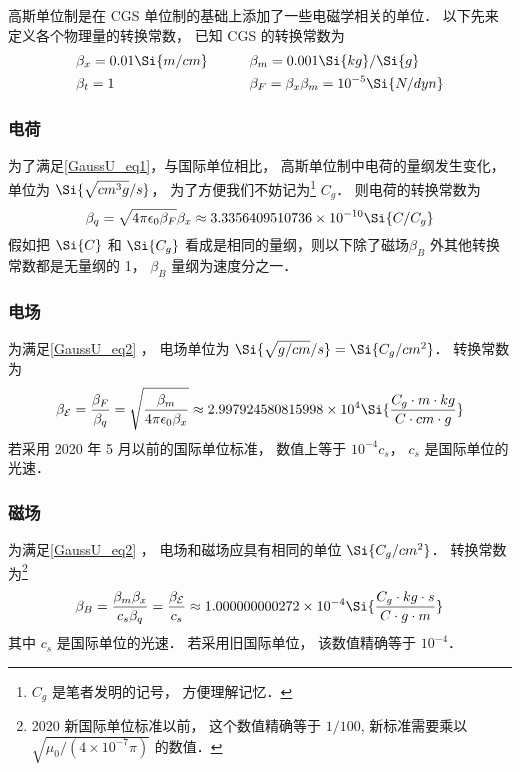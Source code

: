 

高斯单位制是在 CGS 单位制的基础上添加了一些电磁学相关的单位． 以下先来定义各个物理量的转换常数， 
已知 CGS 的转换常数为
\begin{equation}
\begin{aligned}
&\beta_x = 0.01\Si{m/cm} &\qquad &\beta_m = 0.001\Si{kg}/\Si{g}\\
&\beta_t = 1 &\qquad  &\beta_F = \beta_x \beta_m = 10^{-5}\Si{N/dyn}
\end{aligned}
\end{equation}

\subsubsection{电荷}
为了满足\autoref{GaussU_eq1}，与国际单位相比， 高斯单位制中电荷的量纲发生变化， 单位为 $\Si{\sqrt{cm^3 g}/s}$， 为了方便我们不妨记为\footnote{$C_g$ 是笔者发明的记号， 方便理解记忆．} $C_g$． 则电荷的转换常数为
\begin{equation}
\beta_q = \sqrt{4\pi\epsilon_0\beta_F} \beta_x \approx 3.3356409510736\times 10^{-10} \Si{C/C_g}
\end{equation}
假如把 $\Si{C}$ 和 $\Si{C_g}$ 看成是相同的量纲，则以下除了磁场$\beta_B$ 外其他转换常数都是无量纲的 1， $\beta_B$ 量纲为速度分之一．

\subsubsection{电场}
为满足\autoref{GaussU_eq2} ， 电场单位为 $\Si{\sqrt{g/cm}/s} = \Si{C_g/cm^2}$． 转换常数为
\begin{equation}
\beta_{\mathcal E} = \frac{\beta_F}{\beta_q} = \sqrt{\frac{\beta_m}{4\pi\epsilon_0 \beta_x}} \approx 2.997924580815998\times 10^4 \Si{\frac{C_g\cdot m\cdot kg}{C\cdot cm\cdot g}}
\end{equation}
若采用 2020 年 5 月以前的国际单位标准， 数值上等于 $10^{-4} c_{s}$， $c_{s}$ 是国际单位的光速．

\subsubsection{磁场}
为满足\autoref{GaussU_eq2} ， 电场和磁场应具有相同的单位 $\Si{C_g/cm^2}$． 转换常数为\footnote{2020 新国际单位标准以前， 这个数值精确等于 $1/100$, 新标准需要乘以 $\sqrt{\mu_0/(4\times 10^{-7}\pi)}$ 的数值．}
\begin{equation}
\beta_B = \frac{\beta_m\beta_x}{c_s\beta_q} = \frac{\beta_{\mathcal E}}{c_s} \approx 1.000000000272\times 10^{-4} \Si{\frac{C_g\cdot kg \cdot s}{C \cdot g \cdot m}}
\end{equation}
其中 $c_{s}$ 是国际单位的光速． 若采用旧国际单位， 该数值精确等于 $10^{-4}$．


